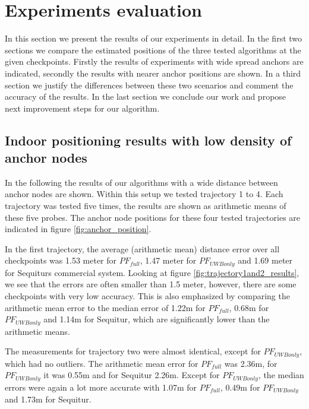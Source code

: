 
\chapter{Experiments evaluation} %

\label{Chapter5} %
In this section we present the results of our experiments in detail. In the first two sections we compare the estimated positions of the three tested algorithms at the given checkpoints. Firstly the results of experiments with wide spread anchors are indicated, secondly the results with nearer anchor positions are shown. In a third section we justify the differences between these two scenarios and comment the accuracy of the results. In the last section we conclude our work and propose next improvement steps for our algorithm. 


\section{Indoor positioning results with low density of anchor nodes}
In the following the results of our algorithms with a wide distance between anchor nodes are shown. Within this setup we tested trajectory 1 to 4. Each trajectory was tested five times, the results are shown as arithmetic means of these five probes. The anchor node positions for these four tested trajectories are indicated in figure \ref{fig:anchor_position}.

In the first trajectory, the average (arithmetic mean) distance error over all checkpoints was 1.53 meter for $PF_{full}$, 1.47 meter for $PF_{UWBonly}$ and 1.69 meter for Sequiturs commercial system. Looking at figure \ref{fig:trajectory1and2_results}, we see that the errors are often smaller than 1.5 meter, however, there are some checkpoints with very low accuracy. This is also emphasized by comparing the arithmetic mean error to the median error of 1.22m for $PF_{full}$, 0.68m for $PF_{UWBonly}$ and 1.14m for Sequitur, which are significantly lower than the arithmetic means.

The measurements for trajectory two were almost identical, except for $PF_{UWBonly}$, which had no outliers. The arithmetic mean error for $PF_{full}$ was 2.36m, for $PF_{UWBonly}$ it was 0.55m and for Sequitur 2.26m. Except for $PF_{UWBonly}$, the median errors were again a lot more accurate with 1.07m for $PF_{full}$, 0.49m for $PF_{UWBonly}$ and 1.73m for Sequitur.

